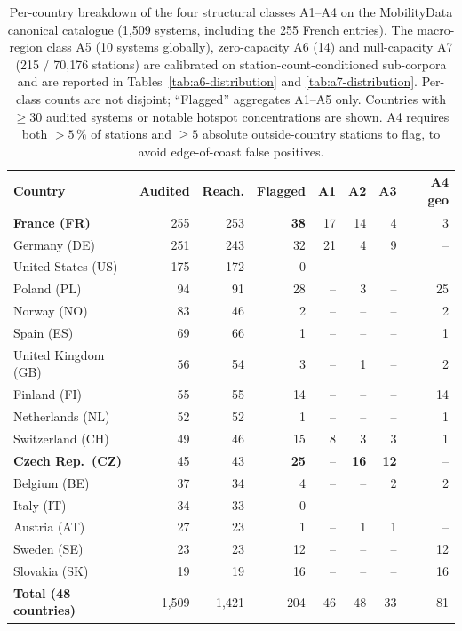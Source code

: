 \documentclass[11pt,a4paper]{article}
\begin{document}
\begin{table}[ht]
\centering
\caption{Per-country breakdown of the four structural classes
A1--A4 on the MobilityData canonical catalogue (1{,}509 systems,
including the 255 French entries). The macro-region class A5
(10 systems globally), zero-capacity A6 (14) and null-capacity A7
(215 / 70{,}176 stations) are calibrated on station-count-conditioned
sub-corpora and are reported in
Tables~\ref{tab:a6-distribution} and \ref{tab:a7-distribution}.
Per-class counts are not disjoint; ``Flagged'' aggregates A1--A5
only. Countries with $\geq 30$ audited systems or notable hotspot
concentrations are shown. A4 requires both $>5\,\%$ of stations
and $\geq 5$ absolute outside-country stations to flag, to avoid
edge-of-coast false positives.}
\label{tab:global-audit}
\small
\begin{tabular}{@{}lrrrrrrr@{}}
\toprule
\textbf{Country} & \textbf{Audited} & \textbf{Reach.} & \textbf{Flagged}
   & \textbf{A1} & \textbf{A2} & \textbf{A3} & \textbf{A4 geo}\\
\midrule
\textbf{France (FR)}      & 255 & 253 & \textbf{38} & 17 & 14 &  4 &  3 \\
Germany (DE)              & 251 & 243 & 32 & 21 &  4 &  9 & -- \\
United States (US)        & 175 & 172 &  0 & -- & -- & -- & -- \\
Poland (PL)               &  94 &  91 & 28 & -- &  3 & -- & 25 \\
Norway (NO)               &  83 &  46 &  2 & -- & -- & -- &  2 \\
Spain (ES)                &  69 &  66 &  1 & -- & -- & -- &  1 \\
United Kingdom (GB)       &  56 &  54 &  3 & -- &  1 & -- &  2 \\
Finland (FI)              &  55 &  55 & 14 & -- & -- & -- & 14 \\
Netherlands (NL)          &  52 &  52 &  1 & -- & -- & -- &  1 \\
Switzerland (CH)          &  49 &  46 & 15 &  8 &  3 &  3 &  1 \\
\textbf{Czech Rep.\ (CZ)} &  45 &  43 & \textbf{25} & -- & \textbf{16} & \textbf{12} & -- \\
Belgium (BE)              &  37 &  34 &  4 & -- & -- &  2 &  2 \\
Italy (IT)                &  34 &  33 &  0 & -- & -- & -- & -- \\
Austria (AT)              &  27 &  23 &  1 & -- &  1 &  1 & -- \\
Sweden (SE)               &  23 &  23 & 12 & -- & -- & -- & 12 \\
Slovakia (SK)             &  19 &  19 & 16 & -- & -- & -- & 16 \\
\midrule
\textbf{Total (48 countries)} & 1{,}509 & 1{,}421 & 204 & 46 & 48 & 33 & 81 \\
\bottomrule
\end{tabular}


\end{table}
\end{document}
